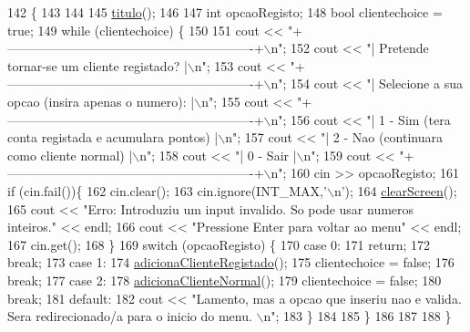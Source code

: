 \begin{DoxyCode}
142                               \{
143 
144 
145     \hyperlink{classEmpresa_ad79f7196a8ce7256771cbd7b9542155c}{titulo}();
146 
147     \textcolor{keywordtype}{int} opcaoRegisto;
148     \textcolor{keywordtype}{bool} clientechoice = \textcolor{keyword}{true};
149     \textcolor{keywordflow}{while} (clientechoice) \{
150 
151         cout << \textcolor{stringliteral}{"+----------------------------------------------------------+\(\backslash\)n"};
152         cout << \textcolor{stringliteral}{"| Pretende tornar-se um cliente registado?                 |\(\backslash\)n"};
153         cout << \textcolor{stringliteral}{"+----------------------------------------------------------+\(\backslash\)n"};
154         cout << \textcolor{stringliteral}{"| Selecione a sua opcao (insira apenas o numero):          |\(\backslash\)n"};
155         cout << \textcolor{stringliteral}{"+----------------------------------------------------------+\(\backslash\)n"};
156         cout << \textcolor{stringliteral}{"| 1 - Sim (tera conta registada e acumulara pontos)        |\(\backslash\)n"};
157         cout << \textcolor{stringliteral}{"| 2 - Nao (continuara como cliente normal)                 |\(\backslash\)n"};
158         cout << \textcolor{stringliteral}{"| 0 - Sair                                                 |\(\backslash\)n"};
159         cout << \textcolor{stringliteral}{"+----------------------------------------------------------+\(\backslash\)n"};
160         cin >> opcaoRegisto;
161         \textcolor{keywordflow}{if} (cin.fail())\{
162             cin.clear();
163             cin.ignore(INT\_MAX,\textcolor{charliteral}{'\(\backslash\)n'});
164             \hyperlink{menu_8h_aceb70c1ed7e11f0863a868704f02214b}{clearScreen}();
165             cout << \textcolor{stringliteral}{"Erro: Introduziu um input invalido. So pode usar numeros inteiros."} << endl;
166             cout << \textcolor{stringliteral}{"Pressione Enter para voltar ao menu"} << endl;
167             cin.get();
168         \}
169         \textcolor{keywordflow}{switch} (opcaoRegisto) \{
170         \textcolor{keywordflow}{case} 0:
171             \textcolor{keywordflow}{return};
172             \textcolor{keywordflow}{break};
173         \textcolor{keywordflow}{case} 1:
174             \hyperlink{classEmpresa_a430c00a63ef70338de3b4b7c096ea194}{adicionaClienteRegistado}();
175             clientechoice = \textcolor{keyword}{false};
176             \textcolor{keywordflow}{break};
177         \textcolor{keywordflow}{case} 2:
178             \hyperlink{classEmpresa_a372599c8aee20690517cc3ae6c8e1ca7}{adicionaClienteNormal}();
179             clientechoice = \textcolor{keyword}{false};
180             \textcolor{keywordflow}{break};
181         \textcolor{keywordflow}{default}:
182             cout << \textcolor{stringliteral}{"Lamento, mas a opcao que inseriu nao e valida. Sera redirecionado/a para o inicio do
       menu. \(\backslash\)n"};
183         \}
184 
185     \}
186 
187 
188 \}
\end{DoxyCode}
